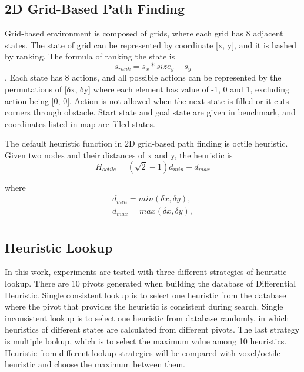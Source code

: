 \documentclass[twocolumn]{article}
\begin{document}
\subsection{2D Grid-Based Path Finding}

Grid-based environment is composed of grids, where each grid has 8 adjacent states. The state of grid can be represented by coordinate [x, y], and it is hashed by ranking. The formula of ranking the state is \begin{equation}
    s_{rank} = s_x * size_y + s_y
\end{equation} . Each state has 8 actions,  and all possible actions can be represented by the permutations of [δx, δy] where each element has value of -1, 0 and 1, excluding action being [0, 0]. Action is not allowed when the next state is filled or it cuts corners through obstacle.  Start state and goal state are given in benchmark, and coordinates listed in map are filled states.  

The default heuristic function in 2D grid-based path finding is octile heuristic. Given two nodes and their distances of x and y, the heuristic is 
\begin{equation}
H_{octile} = (\sqrt{2}-1)d_{min} + d_{max}
\end{equation}

where
\begin{gather*}
    d_{min} = min(\delta x, \delta y), \\
    d_{max} = max(\delta x, \delta y), \\
\end{gather*}

\subsection{Heuristic Lookup}


In this work, experiments are tested with three different strategies of heuristic lookup. There are 10 pivots generated when building the database of Differential Heuristic. Single consistent lookup is to select one heuristic from the database where the pivot that provides the heuristic is consistent during search. Single inconsistent lookup is to select one heuristic from database randomly, in which heuristics of different states are calculated from different pivots. The last strategy is multiple lookup, which is to select the maximum value among 10 heuristics. Heuristic from different lookup strategies will be compared with voxel/octile heuristic and choose the maximum between them.
\end{document}
